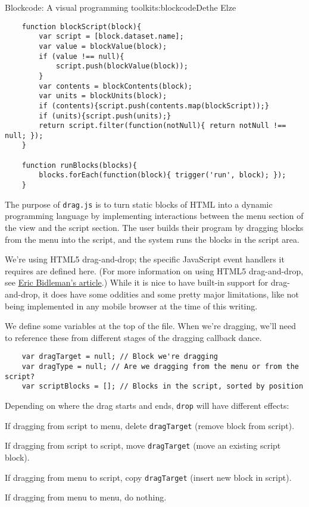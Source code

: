 \begin{aosachapter}{Blockcode: A visual programming toolkit}{s:blockcode}{Dethe Elze}
\begin{verbatim}
    function blockScript(block){
        var script = [block.dataset.name];
        var value = blockValue(block);
        if (value !== null){
            script.push(blockValue(block));
        }
        var contents = blockContents(block);
        var units = blockUnits(block);
        if (contents){script.push(contents.map(blockScript));}
        if (units){script.push(units);}
        return script.filter(function(notNull){ return notNull !== null; });
    }

    function runBlocks(blocks){
        blocks.forEach(function(block){ trigger('run', block); });
    }
\end{verbatim}

\label{drag.js}

The purpose of \texttt{drag.js} is to turn static blocks of HTML into a
dynamic programming language by implementing interactions between the
menu section of the view and the script section. The user builds their
program by dragging blocks from the menu into the script, and the system
runs the blocks in the script area.

We're using HTML5 drag-and-drop; the specific JavaScript event handlers
it requires are defined here. (For more information on using HTML5
drag-and-drop, see
\href{http://www.html5rocks.com/en/tutorials/dnd/basics/}{Eric
Bidleman's article}.) While it is nice to have built-in support for
drag-and-drop, it does have some oddities and some pretty major
limitations, like not being implemented in any mobile browser at the
time of this writing.

We define some variables at the top of the file. When we're dragging,
we'll need to reference these from different stages of the dragging
callback dance.

\begin{verbatim}
    var dragTarget = null; // Block we're dragging
    var dragType = null; // Are we dragging from the menu or from the script?
    var scriptBlocks = []; // Blocks in the script, sorted by position
\end{verbatim}

Depending on where the drag starts and ends, \texttt{drop} will have
different effects:

\begin{aosaitemize}

\item
  If dragging from script to menu, delete \texttt{dragTarget} (remove
  block from script).
\item
  If dragging from script to script, move \texttt{dragTarget} (move an
  existing script block).
\item
  If dragging from menu to script, copy \texttt{dragTarget} (insert new
  block in script).
\item
  If dragging from menu to menu, do nothing.
\end{aosaitemize}


\end{aosachapter}

